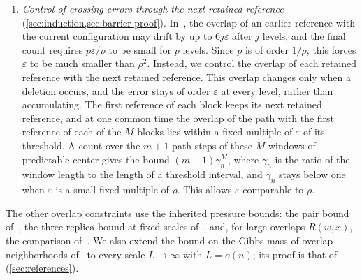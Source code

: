 \begin{enumerate}
$F_n/n\ge P_\beta-c_0\rho^3$, for a fixed $c_0>0$. Let $\delta\in(0,c_0)$ be
fixed such that $\Delta_{n,\beta}\le(c_0-\delta)\rho^3$ for all
sufficiently large $n$; this margin is obtained by choosing the constant $R$
in $\rho=Rn^{-7/30}$ large. Chebyshev's inequality and the variance bound
of~\cite[Theorem~1.4]{quantitative-parisi} give
\[
 \PP\bigl\{F_n/n<P_\beta-c_0\rho^3\bigr\}
 \le\frac{\Var(F_n)}{\delta^2n^2\rho^6}
 \le C_{\beta,\delta}\,n^{-23/15}\rho^{-6},
\]
which is $O(n^{-2/15})$ for $\rho=Rn^{-7/30}$. We intersect this event with
the bounds on polynomially many constrained partition functions, and the
complement of the resulting event, whose probability tends to zero, is
discarded once and for all. On this event, the number
of reference configurations and path steps, which is exponential in
$1/\rho$, multiplies only the conditional Gibbs probability of a violation,
which is at most $e^{-cn\rho^3}$. This replaces the probability estimate
of~\cite[Lemma~4.2]{oai-barriers}.
\item \emph{Control of crossing errors through the next retained reference}
(\cref{sec:induction,sec:barrier-proof}). In~\cite[Section~8.4]{oai-barriers},
the overlap of an earlier reference with the current configuration may drift
by up to $6j\varepsilon$ after $j$ levels, and the final count requires
$p\varepsilon/\rho$ to be small for $p$ levels. Since $p$ is of order
$1/\rho$, this forces $\varepsilon$ to be much smaller than $\rho^2$.
Instead, we control the overlap of each retained reference with the next
retained reference. This overlap changes only when a deletion occurs, and the
error stays of order $\varepsilon$ at every level, rather than accumulating.
The first reference of each block keeps its next retained
reference, and at one common time the overlap of the path with the first
reference of each of the $M$ blocks lies within a fixed multiple of
$\varepsilon$ of its threshold. A count over the $m+1$ path steps of these
$M$ windows of predictable center gives the bound $(m+1)\gamma_n^M$, where
$\gamma_n$ is the ratio of the window length to the length of a threshold
interval, and $\gamma_n$ stays below one when $\varepsilon$ is a small fixed
multiple of $\rho$. This allows $\varepsilon$ comparable to $\rho$.
\end{enumerate}
The other overlap constraints use the inherited pressure bounds:
the pair bound of~\cite[Lemma~4.3]{oai-barriers}, the three-replica bound at
fixed scales of~\cite[equation~(4.20)]{oai-barriers}, and, for large
overlaps $R(w,x)$, the comparison of~\cite[Section~7, Steps~5--8]{oai-barriers}.
We also extend the bound on the Gibbs mass of overlap neighborhoods
of~\cite[Proposition~6.1]{oai-barriers} to every scale $L\to\infty$ with
$L=o(n)$; its proof is that of~\cite{oai-barriers}
(\cref{sec:references}).

